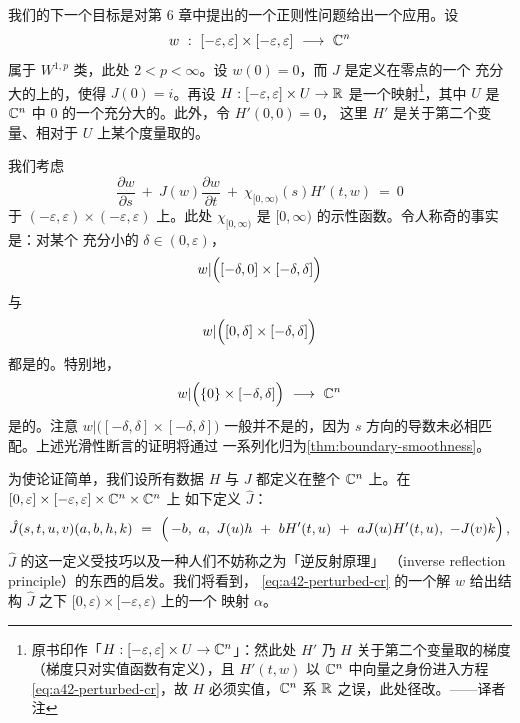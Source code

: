 我们的下一个目标是对第 6 章中提出的一个正则性问题给出一个应用。设
\[
w\ :\ [-\varepsilon,\varepsilon]\times[-\varepsilon,\varepsilon]\ \longrightarrow\ \C^{n}
\]
属于 $W^{1,p}$ 类，此处 $2<p<\infty$。设 $w(0)=0$，而 $J$ 是定义在零点的一个%
充分大的\trNeighborhood{}上的\trAlmostComplexStructure，使得 $J(0)=i$。再设%
 $H:[-\varepsilon,\varepsilon]\times U\to\mathbb{R}$ 是一个\trSmooth{}映射\footnote{原书印作「$H:[-\varepsilon,\varepsilon]\times U\to\mathbb{C}^{n}$」：然此处 $H'$ 乃 $H$ 关于第二个变量取的梯度（梯度只对实值函数有定义），且 $H'(t,w)$ 以 $\mathbb{C}^{n}$ 中向量之身份进入方程 \eqref{eq:a42-perturbed-cr}，故 $H$ 必须实值，$\mathbb{C}^{n}$ 系 $\mathbb{R}$ 之误，此处径改。——译者注}，其中%
 $U$ 是 $\mathbb{C}^{n}$ 中 $0$ 的一个充分大的\trNeighborhood。此外，令 $H'(0,0)=0$，%
这里 $H'$ 是关于第二个变量、相对于 $U$ 上某个\trRiemann{}度量取的\trGradient。

我们考虑\trPartialDifferentialEquation
\begin{equation}\label{eq:a42-perturbed-cr}
\frac{\partial w}{\partial s}\ +\ J(w)\frac{\partial w}{\partial t}\ +\ \chi_{[0,\infty)}(s)H'(t,w)\ =\ 0
\end{equation}
于 $(-\varepsilon,\varepsilon)\times(-\varepsilon,\varepsilon)$ 上。此处%
 $\chi_{[0,\infty)}$ 是 $[0,\infty)$ 的示性函数。令人称奇的事实是：对某个%
充分小的 $\delta\in(0,\varepsilon)$，
\[
w|\Bigl([-\delta,0]\times[-\delta,\delta]\Bigr)
\]
与
\[
w|\Bigl([0,\delta]\times[-\delta,\delta]\Bigr)
\]
都是\trSmooth{}的。特别地，
\[
w|\Bigl(\{0\}\times[-\delta,\delta]\Bigr)\ \longrightarrow\ \C^{n}
\]
是\trSmooth{}的。注意 $w|\bigl([-\delta,\delta]\times[-\delta,\delta]\bigr)$ %
一般并不是\trSmooth{}的，因为 $s$ 方向的导数未必相匹配。上述光滑性断言的证明将通过%
一系列\trTransformation{}化归为\cref{thm:boundary-smoothness}。

为使论证简单，我们设所有数据 $H$ 与 $J$ 都定义在整个 $\mathbb{C}^{n}$ 上。在%
 $[0,\varepsilon]\times[-\varepsilon,\varepsilon]\times\mathbb{C}^{n}\times\mathbb{C}^{n}$ 上%
如下定义\trAlmostComplexStructure{} $\hat{J}$：
\[
\hat{J}(s,t,u,v)(a,b,h,k)\ =\ \Bigl(\,-b,\ a,\ J(u)h\ +\ bH'(t,u)\ +\ aJ(u)H'(t,u),\ -J(v)k\Bigr)\,,
\]
$\hat{J}$ 的这一定义受\trGromov{}技巧以及一种人们不妨称之为「逆反射原理」%
（inverse reflection principle）的东西的启发。我们将看到，%
\eqref{eq:a42-perturbed-cr} 的一个解 $w$ 给出结构 $\hat{J}$ 之下%
 $[0,\varepsilon)\times[-\varepsilon,\varepsilon)$ 上的一个\trHolomorphic{}%
映射 $\alpha$。

